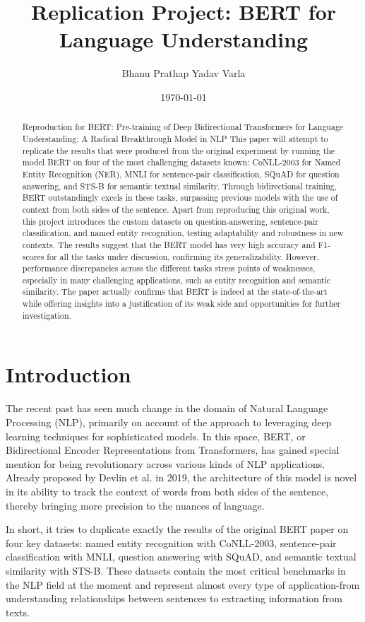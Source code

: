 ﻿\documentclass{article}
\title{Replication Project: BERT for Language Understanding}
\author{Bhanu Prathap Yadav Varla}
\date{\today}
\begin{document}
\maketitle

\begin{abstract}
Reproduction for BERT: Pre-training of Deep Bidirectional Transformers for Language Understanding: A Radical Breakthrough Model in NLP This paper will attempt to replicate the results that were produced from the original experiment by running the model BERT on four of the most challenging datasets known: CoNLL-2003 for Named Entity Recognition (NER), MNLI for sentence-pair classification, SQuAD for question answering, and STS-B for semantic textual similarity. Through bidirectional training, BERT outstandingly excels in these tasks, surpassing previous models with the use of context from both sides of the sentence.
Apart from reproducing this original work, this project introduces the custom datasets on question-answering, sentence-pair classification, and named entity recognition, testing adaptability and robustness in new contexts. The results suggest that the BERT model has very high accuracy and F1-scores for all the tasks under discussion, confirming its generalizability. However, performance discrepancies across the different tasks stress points of weaknesses, especially in many challenging applications, such as entity recognition and semantic similarity. The paper actually confirms that BERT is indeed at the state-of-the-art while offering insights into a justification of its weak side and opportunities for further investigation.
\end{abstract}

\section{Introduction}
The recent past has seen much change in the domain of Natural Language Processing (NLP), primarily on account of the approach to leveraging deep learning techniques for sophisticated models. In this space, BERT, or Bidirectional Encoder Representations from Transformers, has gained special mention for being revolutionary across various kinds of NLP applications. Already proposed by Devlin et al. in 2019, the architecture of this model is novel in its ability to track the context of words from both sides of the sentence, thereby bringing more precision to the nuances of language.

In short, it tries to duplicate exactly the results of the original BERT paper on four key datasets: named entity recognition with CoNLL-2003, sentence-pair classification with MNLI, question answering with SQuAD, and semantic textual similarity with STS-B. These datasets contain the most critical benchmarks in the NLP field at the moment and represent almost every type of application-from understanding relationships between sentences to extracting information from texts.
\end{document}
